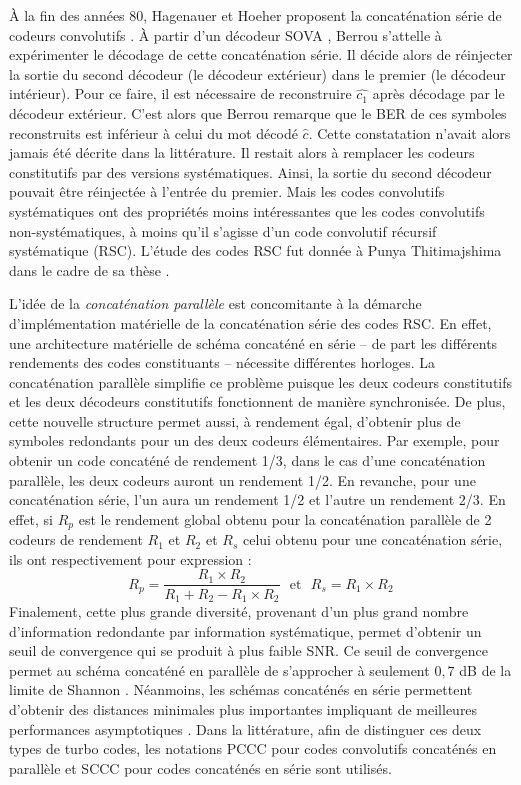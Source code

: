 À la fin des années 80, Hagenauer et Hoeher proposent la concaténation série de codeurs convolutifs \cite{hagenauerConcatenated}.
À partir d'un décodeur SOVA \cite{BerrouHardwareSOVA}, Berrou s’attelle à expérimenter le décodage de cette 
concaténation série. Il décide alors de réinjecter la sortie du second décodeur (le décodeur extérieur) dans le premier
(le décodeur intérieur). Pour ce faire, il est nécessaire de reconstruire $\hat{c_1}$ après décodage par le décodeur extérieur.
C'est alors que Berrou remarque que le BER de ces symboles reconstruits est inférieur à celui du mot décodé $\hat{c}$. 
Cette constatation n'avait alors jamais été décrite dans la littérature. Il restait alors à remplacer les codeurs constitutifs 
par des versions systématiques. Ainsi, la sortie du second décodeur pouvait être réinjectée à l'entrée du premier.
Mais les codes convolutifs systématiques ont des propriétés moins intéressantes que les codes convolutifs non-systématiques, 
à moins qu'il s’agisse d'un code convolutif récursif systématique (RSC). L'étude des codes RSC fut donnée à Punya Thitimajshima
dans le cadre de sa thèse \cite{rscTheseTelecom}.

L'idée de la \emph{concaténation parallèle} est concomitante à la démarche d'implémentation matérielle de la 
concaténation série des codes RSC. En effet, une architecture matérielle de schéma concaténé en série -- de part les 
différents rendements des codes constituants -- nécessite différentes horloges. La concaténation parallèle simplifie ce
problème puisque les deux codeurs constitutifs et les deux décodeurs constitutifs fonctionnent de manière synchronisée. De plus,
cette nouvelle structure permet aussi, à rendement égal, d'obtenir plus de symboles redondants pour un des deux codeurs 
élémentaires.
Par exemple, pour obtenir un code concaténé de rendement 1/3, 
dans le cas d'une concaténation parallèle, les deux codeurs auront un rendement 1/2. En revanche, pour une
concaténation série, l'un aura un rendement 1/2 et l'autre un rendement 2/3. En effet, si $R_p$ est le rendement 
global obtenu pour la concaténation parallèle de 2 codeurs de rendement $R_1$ et $R_2$ et $R_s$ celui obtenu pour une 
concaténation série, ils ont respectivement pour expression : 
\[R_p = \frac{R_1 \times R_2}{R_1 + R_2 - R_1 \times R_2} \ \ \ \text{et} \ \ \ R_s = R_1 \times R_2\]
Finalement, cette plus grande diversité, provenant d'un plus grand nombre d'information redondante par information 
systématique, permet d'obtenir un seuil de convergence qui se produit à plus faible SNR. Ce 
seuil de convergence permet au schéma concaténé en parallèle de s'approcher à seulement $0,7$ dB de la limite de Shannon 
\cite{berrouTC}. Néanmoins, les schémas concaténés en série permettent d'obtenir des distances minimales plus 
importantes impliquant de meilleures performances asymptotiques \cite{declercq2014channel}. Dans la littérature, afin de distinguer
ces deux types de turbo codes, les notations PCCC pour codes convolutifs concaténés en parallèle et SCCC pour codes
concaténés en série sont utilisés.

